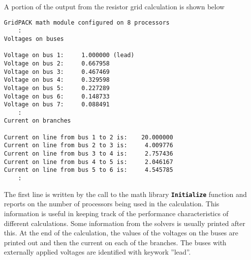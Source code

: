 A portion of the output from the resistor grid calculation is shown below

{
\color{red}
\begin{Verbatim}[fontseries=b]
GridPACK math module configured on 8 processors
    :
Voltages on buses

Voltage on bus 1:     1.000000 (lead)
Voltage on bus 2:     0.667958
Voltage on bus 3:     0.467469
Voltage on bus 4:     0.329598
Voltage on bus 5:     0.227289
Voltage on bus 6:     0.148733
Voltage on bus 7:     0.088491
    :
Current on branches

Current on line from bus 1 to 2 is:    20.000000
Current on line from bus 2 to 3 is:     4.009776
Current on line from bus 3 to 4 is:     2.757436
Current on line from bus 4 to 5 is:     2.046167
Current on line from bus 5 to 6 is:     4.545785
    :
\end{Verbatim}
}

The first line is written by the call to the math library
\texttt{\textbf{Initialize}} function and reports on the number of processors
being used in the calculation. This information is useful in keeping track of
the performance characteristics of different calculations. Some information from
the solvers is usually printed after this. At the end of the calculation, the
values of the voltages on the buses are printed out and then the current on each
of the branches. The buses with externally applied voltages are identified
with keywork ''lead''.

